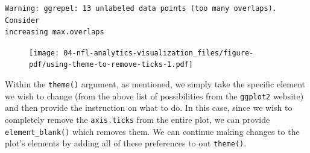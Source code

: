 \documentclass[
  letterpaper,
]{krantz}
\begin{document}
\begin{verbatim}
Warning: ggrepel: 13 unlabeled data points (too many overlaps). Consider
increasing max.overlaps
\end{verbatim}

\begin{figure}[H]

{\centering \texttt{[image: 04-nfl-analytics-visualization\_files/figure-pdf/using-theme-to-remove-ticks-1.pdf]}

}

\end{figure}

Within the \texttt{theme()} argument, as mentioned, we simply take the
specific element we wish to change (from the above list of possibilities
from the \texttt{ggplot2} website) and then provide the instruction on
what to do. In this case, since we wish to completely remove the
\texttt{axis.ticks} from the entire plot, we can provide
\texttt{element\_blank()} which removes them. We can continue making
changes to the plot's elements by adding all of these preferences to out
\texttt{theme()}.
\end{document}
